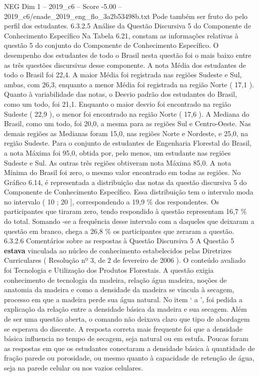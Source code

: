 \begin{textsample}{NEG Dim 1 – 2019\_c6 – Score -5.00 – 2019\_c6/enade\_2019\_eng\_flo\_3a2b53498b.txt}
Pode também ser fruto do pelo perfil dos estudantes. 6.3.2.5 Análise da Questão Discursiva 5 do Componente de Conhecimento Específico Na Tabela 6.21, constam as informações relativas à questão 5 do conjunto do Componente de Conhecimento Específico.
O desempenho dos estudantes de todo o Brasil nesta questão foi o mais baixo entre as três questões discursivas desse componente.
A nota Média dos estudantes de todo o Brasil foi 22,4.
A maior Média foi registrada nas regiões Sudeste e Sul, ambas, com 26,3, enquanto a menor Média foi registrada na região Norte ( 17,1 ).
Quanto à variabilidade das notas, o Desvio padrão dos estudantes do Brasil, como um todo, foi 21,1.
Enquanto o maior desvio foi encontrado na região Sudeste ( 22,9 ), o menor foi encontrado na região Norte ( 17,6 ).
A Mediana do Brasil, como um todo, foi 20,0, a mesma para as regiões Sul e Centro-Oeste.
Nas demais regiões as Medianas foram 15,0, nas regiões Norte e Nordeste, e 25,0, na região Sudeste.
Para o conjunto de estudantes de Engenharia Florestal do Brasil, a nota Máxima foi 95,0, obtida por, pelo menos, um estudante nas regiões Sudeste e Sul.
As outras três regiões obtiveram nota Máxima 85,0.
A nota Mínima do Brasil foi zero, o mesmo valor encontrado em todas as regiões.
No Gráfico 6.14, é representada a distribuição das notas da questão discursiva 5 do Componente de Conhecimento Específico.
Essa distribuição tem o intervalo moda no intervalo ( 10 ; 20 ], correspondendo a 19,9 \% dos respondentes.
Os participantes que tiraram zero, tendo respondido à questão representam 16,7 \% do total.
Somando -se a frequência desse intervalo com a daqueles que deixaram a questão em branco, chega a 26,8 \% os participantes que zeraram a questão. 6.3.2.6 Comentários sobre as respostas à Questão Discursiva 5 A Questão 5 \textbf{estava} vinculada ao núcleo de conhecimento estabelecidos pelas Diretrizes Curriculares ( Resolução nº 3, de 2 de fevereiro de 2006 ).
O conteúdo avaliado foi Tecnologia e Utilização dos Produtos Florestais.
A questão exigia conhecimento de tecnologia da madeira, relação água madeira, noções de anatomia da madeira e como a densidade da madeira se vincula à secagem, processo em que a madeira perde sua água natural.
No item ‘ a ’, foi pedida a explicação da relação entre a densidade básica da madeira e sua secagem.
Além de ser uma questão aberta, o comando não deixava claro que tipo de abordagem se esperava do discente.
A resposta correta mais frequente foi que a densidade básica influencia no tempo de secagem, seja natural ou em estufa.
Poucas foram as respostas em que os estudantes conectaram a densidade básica à quantidade de fração parede ou porosidade, ou mesmo quanto à capacidade de retenção de água, seja na parede celular ou nos vazios celulares.

\end{textsample}
